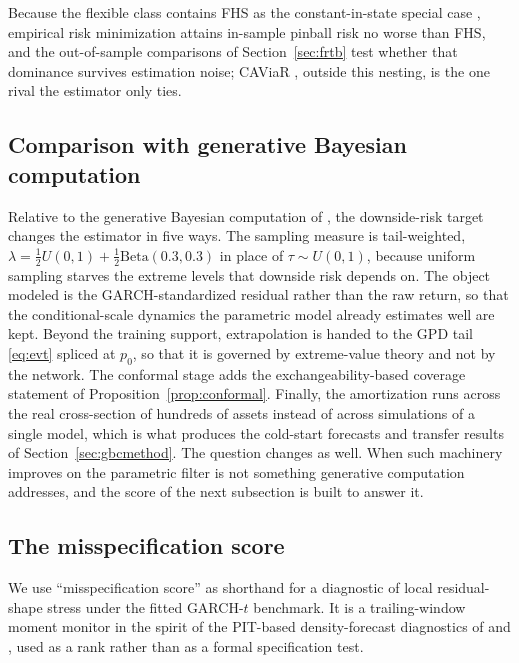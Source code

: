 \documentclass[11pt]{article}
\theoremstyle{remark}
\begin{document}
\medskip\noindent Because the flexible class contains FHS as the constant-in-state special case \citep{baroneadesi1999fhs}, empirical risk minimization attains in-sample pinball risk no worse than FHS, and the out-of-sample comparisons of Section~\ref{sec:frtb} test whether that dominance survives estimation noise; CAViaR \citep{engle2004caviar}, outside this nesting, is the one rival the estimator only ties.

\subsection{Comparison with generative Bayesian computation}\label{sec:polsondelta}

Relative to the generative Bayesian computation of
\citet{polson2023gbc}, the downside-risk target changes the estimator in five ways. The sampling measure is tail-weighted, $\lambda = \tfrac12 U(0,1) + \tfrac12 \mathrm{Beta}(0.3,0.3)$ in place of $\tau\sim U(0,1)$, because uniform sampling starves the extreme levels that downside risk depends on. The object modeled is the GARCH-standardized residual rather than the raw return, so that the conditional-scale dynamics the parametric model already estimates well are kept. Beyond the training support, extrapolation is handed to the GPD tail \eqref{eq:evt} spliced at $p_0$, so that it is governed by extreme-value theory and not by the network. The conformal stage adds the exchangeability-based coverage statement of Proposition~\ref{prop:conformal}. Finally, the amortization runs across the real cross-section of hundreds of assets instead of across simulations of a single model, which is what produces the cold-start forecasts and transfer results of Section~\ref{sec:gbcmethod}. The question changes as well. When such machinery improves on the parametric filter is not something generative computation addresses, and the score of the next subsection is built to answer it.

\subsection{The misspecification score}\label{sec:score}

We use ``misspecification score'' as shorthand for a diagnostic of local
residual-shape stress under the fitted GARCH-$t$ benchmark. It is a trailing-window moment monitor in the spirit of the PIT-based density-forecast diagnostics of \citet{dieboldgunthertay1998} and \citet{berkowitz2001}, used as a rank rather than as a formal specification test.
\end{document}
